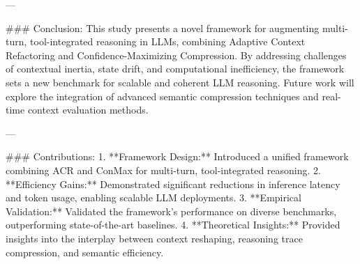 ---

### Conclusion:
This study presents a novel framework for augmenting multi-turn, tool-integrated reasoning in LLMs, combining Adaptive Context Refactoring and Confidence-Maximizing Compression. By addressing challenges of contextual inertia, state drift, and computational inefficiency, the framework sets a new benchmark for scalable and coherent LLM reasoning. Future work will explore the integration of advanced semantic compression techniques and real-time context evaluation methods.

---

### Contributions:
1. **Framework Design:** Introduced a unified framework combining ACR and ConMax for multi-turn, tool-integrated reasoning.
2. **Efficiency Gains:** Demonstrated significant reductions in inference latency and token usage, enabling scalable LLM deployments.
3. **Empirical Validation:** Validated the framework's performance on diverse benchmarks, outperforming state-of-the-art baselines.
4. **Theoretical Insights:** Provided insights into the interplay between context reshaping, reasoning trace compression, and semantic efficiency.